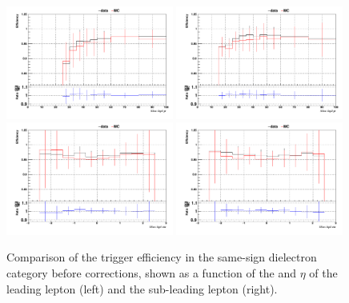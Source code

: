 \begin{figure}[htp]
\centering
\includegraphics[width=0.49\textwidth]{ch6_figs/1D_eff_lep1_pt_ee_ARCv2_change_3l_pt_ranges.pdf}
\includegraphics[width=0.49\textwidth]{ch6_figs/1D_eff_lep2_pt_ee_ARCv2_change_3l_pt_ranges.pdf} \\
\includegraphics[width=0.49\textwidth]{ch6_figs/1D_eff_lep1_eta_ee_ARCv2_change_3l_pt_ranges.pdf}
\includegraphics[width=0.49\textwidth]{ch6_figs/1D_eff_lep2_eta_ee_ARCv2_change_3l_pt_ranges.pdf}
\caption{Comparison of the trigger efficiency in the same-sign dielectron category before 
corrections, shown as a function of the \pt and $\eta$ of the leading lepton (left) 
and the sub-leading lepton (right).}
\label{fig:trigeffsee}
\end{figure}



